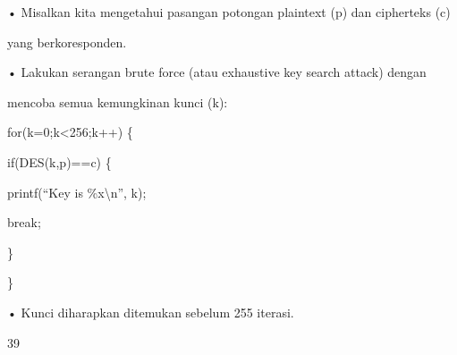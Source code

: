 \documentclass{article}
\begin{document}

• Misalkan kita mengetahui pasangan potongan plaintext (p) dan cipherteks (c) 

yang berkoresponden. 

• Lakukan serangan brute force (atau exhaustive key search attack) dengan 

mencoba semua kemungkinan kunci (k):

for(k=0;k<256;k++) \{

 if(DES(k,p)==c) \{


printf(“Key is \%x\textbackslash{}n”, k);


break;

 \}

\}

• Kunci diharapkan ditemukan sebelum 255 iterasi.

39
\end{document}
